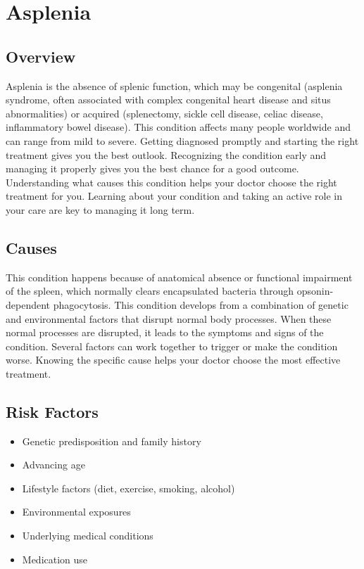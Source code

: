 \chapter{Asplenia}
\label{sec:Asplenia}

\section{Overview}
Asplenia is the absence of splenic function, which may be congenital (asplenia syndrome, often associated with complex congenital heart disease and situs abnormalities) or acquired (splenectomy, sickle cell disease, celiac disease, inflammatory bowel disease). This condition affects many people worldwide and can range from mild to severe. Getting diagnosed promptly and starting the right treatment gives you the best outlook. Recognizing the condition early and managing it properly gives you the best chance for a good outcome. Understanding what causes this condition helps your doctor choose the right treatment for you. Learning about your condition and taking an active role in your care are key to managing it long term.

\section{Causes}
This condition happens because of anatomical absence or functional impairment of the spleen, which normally clears encapsulated bacteria through opsonin-dependent phagocytosis. This condition develops from a combination of genetic and environmental factors that disrupt normal body processes. When these normal processes are disrupted, it leads to the symptoms and signs of the condition. Several factors can work together to trigger or make the condition worse. Knowing the specific cause helps your doctor choose the most effective treatment.

\section{Risk Factors}

\begin{itemize}[noitemsep]
  \item Genetic predisposition and family history
  \item Advancing age
  \item Lifestyle factors (diet, exercise, smoking, alcohol)
  \item Environmental exposures
  \item Underlying medical conditions
  \item Medication use
\end{itemize}

